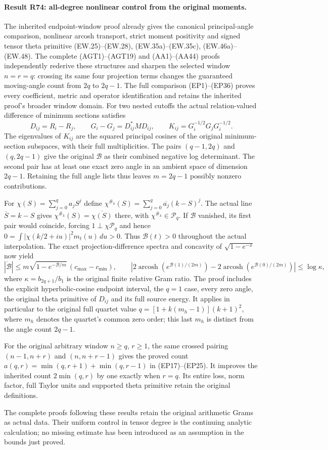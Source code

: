\paragraph{Result R74: all-degree nonlinear control from the original moments.}
The inherited endpoint-window proof already gives the canonical
principal-angle comparison, nonlinear arcosh transport, strict
moment positivity and signed tensor theta primitive
(EW.25)--(EW.28), (EW.35a)--(EW.35c), (EW.46a)--(EW.48).
The complete (AGT1)--(AGT19) and (AA1)--(AA44) proofs independently
rederive these structures and sharpen the selected window $n=r=q$:
crossing its same four projection terms changes the guaranteed
moving-angle count from $2q$ to $2q-1$. The full comparison
(EP1)--(EP36) proves every coefficient, metric and operator
identification and retains the inherited proof's broader window
domain. For two nested cutoffs the actual relation-valued
difference of minimum sections satisfies
\[
D_{ij}=R_i-R_j,\qquad
G_i-G_j=D_{ij}^*MD_{ij},\qquad
K_{ij}=G_i^{-1/2}G_jG_i^{-1/2}.
\]
The eigenvalues of $K_{ij}$ are the squared principal
cosines of the original minimum-section subspaces, with
their full multiplicities. The pairs $(q-1,2q)$ and
$(q,2q-1)$ give the original $\mathcal B$ as their combined
negative log determinant. The second pair has at least
one exact zero angle in an ambient space of dimension
$2q-1$. Retaining the full angle lists thus leaves
$m=2q-1$ possibly nonzero contributions.

For $\chi(S)=\sum_{j=0}^qa_jS^j$ define
$\chi^{\#_k}(S)=\sum_{j=0}^q\overline{a_j}(k-S)^j$.
The actual line $\overline S=k-S$ gives
$\chi^{\#_k}(S)=\overline{\chi(S)}$ there, with
$\chi^{\#_k}\in\mathcal P_q$. If $\mathcal B$ vanished,
its first pair would coincide, forcing
$1\perp\chi\mathcal P_q$ and hence
$0=\int|\chi(k/2+iu)|^2m_t(u)\,du>0$.
Thus $\mathcal B(t)>0$ throughout the actual interpolation.
The exact projection-difference spectra and concavity of
$\sqrt{1-e^{-x}}$ now yield
\[
|\dot{\mathcal B}|
\le m\sqrt{1-e^{-\mathcal B/m}}\,(c_{\max}-c_{\min}),\qquad
\left|2\operatorname{arcosh}(e^{\mathcal B(1)/(2m)})
-2\operatorname{arcosh}(e^{\mathcal B(0)/(2m)})\right|
\le\log\kappa,
\]
where $\kappa=b_{2q+1}/b_1$ is the original finite relative
Gram ratio. The proof includes the explicit hyperbolic-cosine
endpoint interval, the $q=1$ case, every zero angle, the
original theta primitive of $D_{ij}$ and its full source
energy. It applies in particular to the original full
quartet value $q=[1+k(m_h-1)](k+1)^2$, where $m_h$ denotes
the quartet's common zero order; this last $m_h$ is distinct
from the angle count $2q-1$.

For the original arbitrary window $n\ge q$, $r\ge1$, the same
crossed pairing $(n-1,n+r)$ and $(n,n+r-1)$ gives the proved count
$a(q,r)=\min(q,r+1)+\min(q,r-1)$ in (EP17)--(EP25).
It improves the inherited count $2\min(q,r)$ by one exactly
when $r=q$. Its entire loss, norm factor, full Taylor units
and supported theta primitive retain the original definitions.

The complete proofs following these results retain the
original arithmetic Grams as actual data. Their uniform
control in tensor degree is the continuing analytic
calculation; no missing estimate has been introduced as
an assumption in the bounds just proved.
